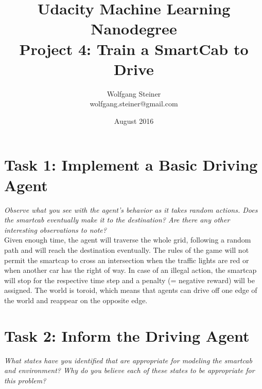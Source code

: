 \documentclass[11pt]{article}
\title{Udacity Machine Learning Nanodegree\\ Project 4: Train a SmartCab to Drive}
\author{Wolfgang Steiner \\ \small{wolfgang.steiner@gmail.com}}
\date{August 2016}
\begin{document}
\maketitle

\section*{Task 1: Implement a Basic Driving Agent}
\textit{Observe what you see with the agent's behavior as it takes random actions. Does the smartcab eventually make it to the destination? Are there any other interesting observations to note?}\\

Given enough time, the agent will traverse the whole grid, following a random path and will reach the destination eventually. The rules of the game will not permit the smartcap to cross an intersection when the traffic lights are red or when another car has the right of way.
In case of an illegal action, the smartcap will stop for the respective time step and a penalty (= negative reward) will be assigned. The world is toroid, which means that agents can drive off one edge of the world and reappear on the opposite edge. 

\section*{Task 2: Inform the Driving Agent}
\textit{What states have you identified that are appropriate for modeling the smartcab and environment? Why do you believe each of these states to be appropriate for this problem?}\\
\end{document}
